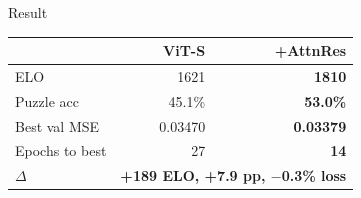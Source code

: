 \documentclass{beamer}
\begin{document}
\begin{frame}
\begin{columns}
\vspace{0.4em}
\begin{block}{Result}
\footnotesize
\begin{tabular}{lrr}
\toprule
& \textbf{ViT-S} & \textbf{+AttnRes} \\
\midrule
ELO          & 1621    & \textbf{1810} \\
Puzzle acc   & 45.1\%  & \textbf{53.0\%} \\
Best val MSE & 0.03470 & \textbf{0.03379} \\
Epochs to best & 27   & \textbf{14} \\
\midrule
$\Delta$ & \multicolumn{2}{c}{\textbf{+189 ELO, +7.9 pp, $-$0.3\% loss}} \\
\bottomrule
\end{tabular}
\end{block}

\end{columns}

\end{frame}
\end{document}
